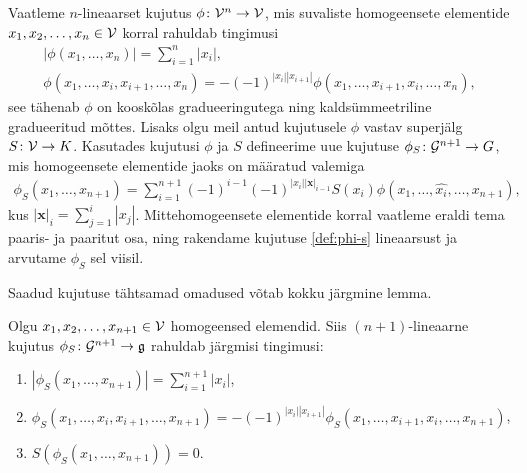 Vaatleme $n$-lineaarset kujutus $\phi \colon \mathcal{V}^n \to \mathcal{V}$, mis
suvaliste homogeensete elementide $x_1, x_2, \dots, x_n \in \mathcal{V}$ korral
rahuldab tingimusi
\begin{gather}
    |\phi(x_1, \dots, x_n)| = \sum_{i=1}^n |x_i|,
        \label{eq:phi-grading}\\
    \phi \left( x_1, \dots, x_i, x_{i+1}, \dots, x_n \right) =
        -(-1)^{ |x_i| |x_{i+1}| } \phi \left(
            x_1, \dots, x_{i+1}, x_i, \dots, x_n
        \right), \label{eq:phi-graded-anticomm}
\end{gather}
see tähenab $\phi$ on kooskõlas gradueeringutega ning
kaldsümmeetriline gradueeritud mõttes. Lisaks olgu meil antud
kujutusele $\phi$ vastav superjälg $S \colon \mathcal{V} \to K$.
Kasutades kujutusi $\phi$ ja $S$ defineerime uue kujutuse
$\phi_S \colon \mathcal{G}^{n+1} \to G$, mis homogeensete elementide
jaoks on määratud valemiga
\begin{align}\label{def:phi-s}
    \phi_S (x_1, \dots, x_{n+1}) =
    \sum_{i=1}^{n+1} (-1)^{i-1}(-1)^{|x_i| |\mathbf{x}|_{i-1} }
        S(x_i) \phi \left(
            x_1, \dots, \hat{x_i}, \dots, x_{n+1}
        \right),
\end{align}
kus $|\mathbf{x}|_{i} = \sum_{j=1}^{i} |x_j|$.
Mittehomogeensete elementide korral vaatleme eraldi tema paaris- ja
paaritut osa, ning rakendame kujutuse \eqref{def:phi-s} lineaarsust
ja arvutame $\phi_S$ sel viisil.

Saadud kujutuse tähtsamad omadused võtab kokku järgmine lemma.

\begin{lemma}\label{lemma:indutseeritud-sulu-omadused}
    Olgu $x_1, x_2, \dots, x_{n+1} \in \mathcal{V}$ homogeensed elemendid.
    Siis $(n+1)$-lineaarne kujutus $\phi_S \colon \mathcal{G}^{n+1} \to \mathfrak{g}$
    rahuldab järgmisi tingimusi:
    \begin{enumerate}[label=\arabic*)]
        \item $ |\phi_S \left(x_1, \dots, x_{n+1} \right)| =
                \sum_{i=1}^{n+1} |x_i|$,
        \item $ \phi_S \left(x_1, \dots, x_i, x_{i+1}, \dots, x_{n+1} \right) =
               -(-1)^{|x_i| |x_{i+1}|} \phi_S \left(
                    x_1, \dots, x_{i+1}, x_i, \dots, x_{n+1}
                \right) $,
        \item $S \left( \phi_S \left( x_1, \dots, x_{n+1} \right) \right) = 0$.
    \end{enumerate}
\end{lemma}


